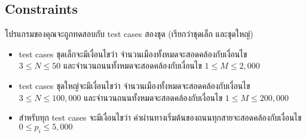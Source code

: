 \subsection*{\sectionfont\upshape Constraints}

โปรแกรมของคุณจะถูกทดสอบกับ test cases สองชุด (เรียกว่าชุดเล็ก และชุดใหญ่)
\begin{itemize}
\item test cases ชุดเล็กจะมีเงื่อนไขว่า จำนวนเมืองทั้งหมดจะสอดคล้องกับเงื่อนไข \\
    $3 \leq N \leq 50$ และจำนวนถนนทั้งหมดจะสอดคล้องกับเงื่อนไข $1 \leq M \leq 2,\!000$
\item test cases ชุดใหญ่จะมีเงื่อนไขว่า จำนวนเมืองทั้งหมดจะสอดคล้องกับเงื่อนไข \\
    $3 \leq N \leq 100,\!000$ และจำนวนถนนทั้งหมดจะสอดคล้องกับเงื่อนไข $1 \leq M \leq 200,\!000$
\item สำหรับทุก test cases จะมีเงื่อนไขว่า ค่าผ่านทางเริ่มต้นของถนนทุกสายจะสอดคล้องกับเงื่อนไข 
    $0 \leq p_i \leq 5,\!000$
\end{itemize}

